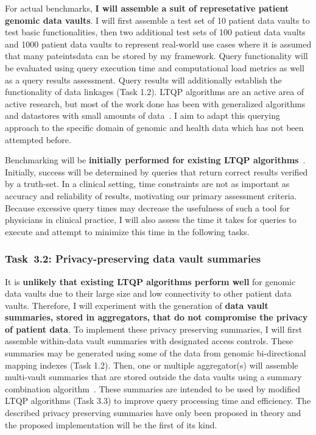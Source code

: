 \documentclass[a4paper,11pt]{article}
\begin{document}
\begin{refsection}
For actual benchmarks, \textbf{I will assemble a suit of represetative patient genomic data vaults}.
I will first assemble a test set of 10 patient data vaults to test basic functionalities, then two additional test sets of 100 patient data vaults and 1000 patient data vaults to represent real-world use cases where it is assumed that many pateints\textquotesingle data can be stored by my framework.
Query functionality will be evaluated using query execution time and computational load metrics as well as a query results assessment. 
Query results will additionally establish the functionality of data linkages (Task 1.2).
LTQP algorithms are an active area of active research, but most of the work done has been with generalized algorithms and datastores with small amounts of data~\cite{taelman_LTQP_2023}.
I aim to adapt this querying approach to the specific domain of genomic and health data which has not been attempted before. 

Benchmarking will be \textbf{initially performed for existing LTQP algorithms}~\cite{taelman_LTQP_2023}.
Initially, success will be determined by queries that return correct results verified by a truth-set.
In a clinical setting, time constraints are not as important as accuracy and reliability of results, motivating our primary assessment criteria.
Because excessive query times may decrease the usefulness of such a tool for physicians in clinical practice, I will also assess the time it takes for queries to execute and attempt to minimize this time in the following tasks.

\newcommand\WPcb{Privacy-preserving data vault summaries}
\subsubsection{Task~3.2: \WPcb}

It is \textbf{unlikely that existing LTQP algorithms perform well} for genomic data vaults due to their large size and low connectivity to other patient data vaults.
Therefore, I will experiment with the generation of \textbf{data vault summaries, stored in aggregators, that do not compromise the privacy of patient data}. 
To implement these privacy preserving summaries, I will first assemble within-data vault summaries with designated access controls.
These summaries may be generated using some of the data from genomic bi-directional mapping indexes (Task 1.2).
Then, one or multiple aggregator(s) will assemble multi-vault summaries that are stored outside the data vaults using a summary combination algorithm~\cite{taelman_privacyAgg_2020}.
These summaries are intended to be used by modified LTQP algorithms (Task 3.3) to improve query processing time and efficiency. 
The described privacy preserving summaries have only been proposed in theory and the proposed implementation will be the first of its kind.



\end{refsection}
\end{document}
